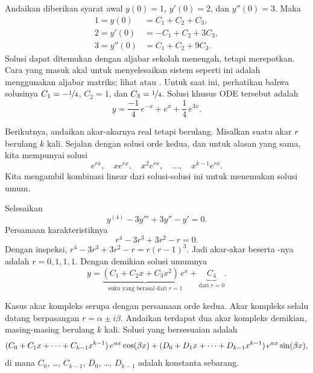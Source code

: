 \begin{example}
Andaikan diberikan syarat awal $y(0) = 1$, $y'(0) = 2$, dan $y''(0) = 3$. Maka
\begin{equation*}
\begin{aligned}
1 = y(0) & = C_1 + C_2 + C_3 , \\
2 = y'(0) & = -C_1 + C_2 + 3C_3 , \\
3 = y''(0) & = C_1 + C_2 + 9C_3 .
\end{aligned}
\end{equation*}
Solusi dapat ditemukan dengan aljabar sekolah menengah, tetapi merepotkan. Cara yang masuk akal untuk menyelesaikan sistem seperti ini adalah menggunakan aljabar matriks; lihat  atau . Untuk saat ini, perhatikan bahwa solusinya $C_1 = -\nicefrac{1}{4}$, $C_2 = 1$, dan $C_3 = \nicefrac{1}{4}$. Solusi khusus ODE tersebut adalah
\begin{equation*}
y = \frac{-1}{4}\, e^{-x} + e^x + \frac{1}{4}\, e^{3x} .
\end{equation*}
\end{example}

Berikutnya, andaikan akar-akarnya real tetapi berulang. Misalkan suatu akar $r$ berulang $k$ kali. Sejalan dengan solusi orde kedua, dan untuk alasan yang sama, kita mempunyai solusi
\begin{equation*}
e^{rx}, \quad xe^{rx}, \quad x^2 e^{rx}, \quad \ldots, \quad x^{k-1} e^{rx} .
\end{equation*}
Kita mengambil kombinasi linear dari solusi-solusi ini untuk menemukan solusi umum.

\begin{example}
Selesaikan
\begin{equation*}
y^{(4)} - 3 y''' + 3 y'' - y' =  0 .
\end{equation*}
Persamaan karakteristiknya
\begin{equation*}
r^4 - 3r^3 + 3r^2 -r = 0 .
\end{equation*}
Dengan inspeksi, $r^4 - 3r^3 + 3r^2 -r = r{(r-1)}^3$. Jadi akar-akar beserta -nya adalah $r = 0, 1, 1, 1$. Dengan demikian solusi umumnya
\begin{equation*}
y = \underbrace{(C_1 + C_2 x + C_3 x^2)\, e^x}_{\text{suku yang berasal dari }
r=1} + \underbrace{C_4}_{\text{dari } r=0} .
\end{equation*}
\end{example}

Kasus akar kompleks serupa dengan persamaan orde kedua. Akar kompleks selalu datang berpasangan $r = \alpha \pm i \beta$. Andaikan terdapat dua akar kompleks demikian, masing-masing berulang $k$ kali. Solusi yang bersesuaian adalah
\begin{equation*}
( C_0 + C_1 x + \cdots + C_{k-1} x^{k-1} ) \, e^{\alpha x} \cos (\beta x)
+
( D_0 + D_1 x + \cdots + D_{k-1} x^{k-1} ) \, e^{\alpha x} \sin (\beta x) ,
\avoidbreak
\end{equation*}
di mana $C_0$, \ldots, $C_{k-1}$, $D_0$, \ldots, $D_{k-1}$ adalah konstanta sebarang.

